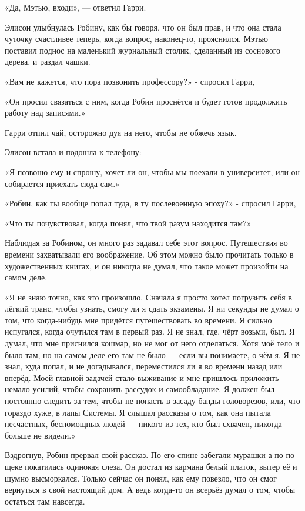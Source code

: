 \documentclass[a5paper, 9pt,
final, openany, twoside=true]{memoir}
\begin{document}
«Да, Мэтью, входи», — ответил Гарри.

Элисон улыбнулась Робину, как бы говоря, что он был прав, и что она стала чуточку счастливее теперь, когда вопрос, наконец-то, прояснился. Мэтью поставил поднос на маленький журнальный столик, сделанный из соснового дерева, и раздал чашки.

«Вам не кажется, что пора позвонить профессору?» - спросил Гарри,

«Он просил связаться с ним, когда Робин проснётся и будет готов продолжить работу над записями.»

Гарри отпил чай, осторожно дуя на него, чтобы не обжечь язык.

Элисон встала и подошла к телефону:

«Я позвоню ему и спрошу, хочет ли он, чтобы мы поехали в университет, или он собирается приехать сюда сам.»\bigskip

«Робин, как ты вообще попал туда, в ту послевоенную эпоху?» - спросил Гарри,

«Что ты почувствовал, когда понял, что твой разум находится там?»

Наблюдая за Робином, он много раз задавал себе этот вопрос. Путешествия во времени захватывали его воображение. Об этом можно было прочитать только в художественных книгах, и он никогда не думал, что такое может произойти на самом деле.

«Я не знаю точно, как это произошло. Сначала я просто хотел погрузить себя в лёгкий транс, чтобы узнать, смогу ли я сдать экзамены. Я ни секунды не думал о том, что когда-нибудь мне придётся путешествовать во времени. Я сильно испугался, когда очутился там в первый раз. Я не знал, где, чёрт возьми, был. Я думал, что мне приснился кошмар, но не мог от него отделаться. Хотя моё тело и было там, но на самом деле его там не было — если вы понимаете, о чём я. Я не знал, куда попал, и не догадывался, переместился ли я во времени назад или вперёд. Моей главной задачей стало выживание и мне пришлось приложить немало усилий, чтобы сохранить рассудок и самообладание. Я должен был постоянно следить за тем, чтобы не попасть в засаду банды головорезов, или, что гораздо хуже, в лапы Системы. Я слышал рассказы о том, как она пытала несчастных, беспомощных людей — никого из тех, кто был схвачен, никогда больше не видели.»

Вздрогнув, Робин прервал свой рассказ. По его спине забегали мурашки а по по щеке покатилась одинокая слеза. Он достал из кармана белый платок, вытер её и шумно высморкался. Только сейчас он понял, как ему повезло, что он смог вернуться в свой настоящий дом. А ведь когда-то он всерьёз думал о том, чтобы остаться там навсегда.\bigskip
\end{document}
